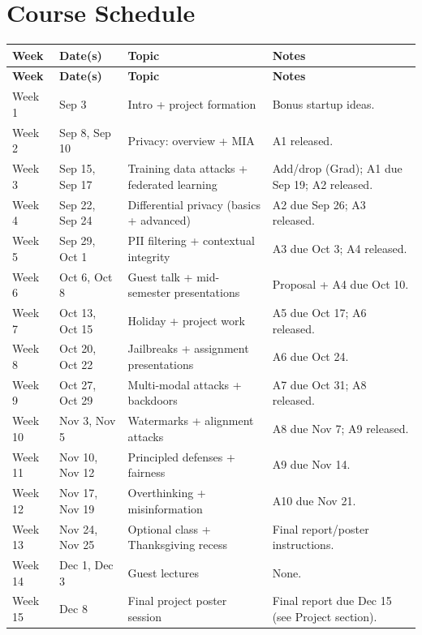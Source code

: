 \documentclass[11pt]{article}
\begin{document}
\section*{Course Schedule}
{\small
\setlength{\tabcolsep}{5pt}
\begin{longtable}{p{0.9in}p{1.1in}p{2.0in}p{1.8in}}
\toprule
\textbf{Week} & \textbf{Date(s)} & \textbf{Topic} & \textbf{Notes} \\
\midrule

\textbf{Week} & \textbf{Date(s)} & \textbf{Topic} & \textbf{Notes} \\
Week 1 & Sep 3 & Intro + project formation & Bonus startup ideas. \\
Week 2 & Sep 8, Sep 10 & Privacy: overview + MIA & A1 released. \\
Week 3 & Sep 15, Sep 17 & Training data attacks + federated learning & Add/drop (Grad); A1 due Sep 19; A2 released. \\
Week 4 & Sep 22, Sep 24 & Differential privacy (basics + advanced) & A2 due Sep 26; A3 released. \\
Week 5 & Sep 29, Oct 1 & PII filtering + contextual integrity & A3 due Oct 3; A4 released. \\
Week 6 & Oct 6, Oct 8 & Guest talk + mid-semester presentations & Proposal + A4 due Oct 10. \\
Week 7 & Oct 13, Oct 15 & Holiday + project work & A5 due Oct 17; A6 released. \\
Week 8 & Oct 20, Oct 22 & Jailbreaks + assignment presentations & A6 due Oct 24. \\
Week 9 & Oct 27, Oct 29 & Multi-modal attacks + backdoors & A7 due Oct 31; A8 released. \\
Week 10 & Nov 3, Nov 5 & Watermarks + alignment attacks & A8 due Nov 7; A9 released. \\
Week 11 & Nov 10, Nov 12 & Principled defenses + fairness & A9 due Nov 14. \\
Week 12 & Nov 17, Nov 19 & Overthinking + misinformation & A10 due Nov 21. \\
Week 13 & Nov 24, Nov 25 & Optional class + Thanksgiving recess & Final report/poster instructions. \\
Week 14 & Dec 1, Dec 3 & Guest lectures & None. \\
Week 15 & Dec 8 & Final project poster session & Final report due Dec 15 (see Project section). \\
\bottomrule
\end{longtable}
}
\end{document}
